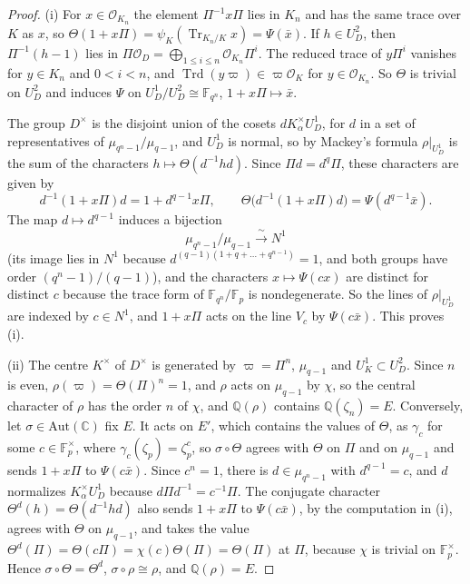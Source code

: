 \documentclass[a4paper,11pt]{amsart}
\theoremstyle{definition}
\theoremstyle{remark}
\numberwithin{equation}{section}
\newcommand{\Q}{\mathbb{Q}}
\DeclareMathOperator{\Tr}{Tr}
\newcommand{\F}{\mathbb{F}}
\newcommand{\C}{\mathbb{C}}
\DeclareMathOperator{\Trd}{Trd}
\begin{document}
\begin{proof}
(i) For $x\in\mathcal O_{K_n}$ the element $\Pi^{-1}x\Pi$ lies in $K_n$ and has the same trace over $K$ as $x$, so $\Theta(1+x\Pi)=\psi_K(\Tr_{K_n/K}x)=\Psi(\bar x)$. If $h\in U_D^2$, then $\Pi^{-1}(h-1)$ lies in $\Pi\mathcal O_D=\bigoplus_{1\le i\le n}\mathcal O_{K_n}\Pi^i$. The reduced trace of $y\Pi^i$ vanishes for $y\in K_n$ and $0<i<n$, and $\Trd(y\varpi)\in\varpi\mathcal O_K$ for $y\in\mathcal O_{K_n}$. So $\Theta$ is trivial on $U_D^2$ and induces $\Psi$ on $U_D^1/U_D^2\cong \F_{q^n}$, $1+x\Pi\mapsto\bar x$.

The group $D^\times$ is the disjoint union of the cosets $dK_\alpha^\times U_D^1$, for $d$ in a set of representatives of $\mu_{q^n-1}/\mu_{q-1}$, and $U_D^1$ is normal, so by Mackey's formula $\rho|_{U_D^1}$ is the sum of the characters $h\mapsto\Theta(d^{-1}hd)$. Since $\Pi d=d^q\Pi$, these characters are given by
\[
 d^{-1}(1+x\Pi)d=1+d^{q-1}x\Pi,\qquad \Theta\bigl(d^{-1}(1+x\Pi)d\bigr)=\Psi(d^{q-1}\bar x).
\]
The map $d\mapsto d^{q-1}$ induces a bijection
\[
 \mu_{q^n-1}/\mu_{q-1}\xrightarrow{\ \sim\ }N^1
\]
(its image lies in $N^1$ because $d^{(q-1)(1+q+\dots+q^{n-1})}=1$, and both groups have order $(q^n-1)/(q-1)$), and the characters $x\mapsto\Psi(cx)$ are distinct for distinct $c$ because the trace form of $\F_{q^n}/\F_p$ is nondegenerate. So the lines of $\rho|_{U_D^1}$ are indexed by $c\in N^1$, and $1+x\Pi$ acts on the line $V_c$ by $\Psi(c\bar x)$. This proves (i).

(ii) The centre $K^\times$ of $D^\times$ is generated by $\varpi=\Pi^n$, $\mu_{q-1}$ and $U_K^1\subset U_D^2$. Since $n$ is even, $\rho(\varpi)=\Theta(\Pi)^n=1$, and $\rho$ acts on $\mu_{q-1}$ by $\chi$, so the central character of $\rho$ has the order $n$ of $\chi$, and $\Q(\rho)$ contains $\Q(\zeta_n)=E$. Conversely, let $\sigma\in\mathrm{Aut}(\C)$ fix $E$. It acts on $E'$, which contains the values of $\Theta$, as $\gamma_c$ for some $c\in\F_p^\times$, where $\gamma_c(\zeta_p)=\zeta_p^{c}$, so $\sigma\circ\Theta$ agrees with $\Theta$ on $\Pi$ and on $\mu_{q-1}$ and sends $1+x\Pi$ to $\Psi(c\bar x)$. Since $c^n=1$, there is $d\in\mu_{q^n-1}$ with $d^{q-1}=c$, and $d$ normalizes $K_\alpha^\times U_D^1$ because $d\Pi d^{-1}=c^{-1}\Pi$. The conjugate character $\Theta^d(h)=\Theta(d^{-1}hd)$ also sends $1+x\Pi$ to $\Psi(c\bar x)$, by the computation in (i), agrees with $\Theta$ on $\mu_{q-1}$, and takes the value $\Theta^d(\Pi)=\Theta(c\Pi)=\chi(c)\Theta(\Pi)=\Theta(\Pi)$ at $\Pi$, because $\chi$ is trivial on $\F_p^\times$. Hence $\sigma\circ\Theta=\Theta^d$, $\sigma\circ\rho\cong\rho$, and $\Q(\rho)=E$.


\end{proof}
\end{document}
